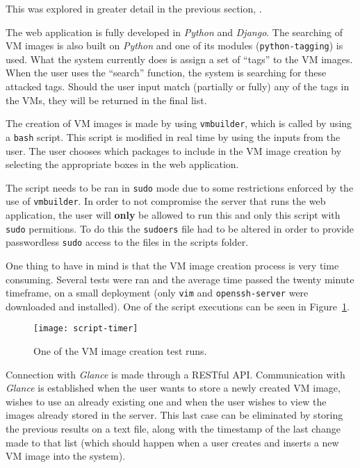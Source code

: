 This was explored in greater detail in the previous section, .


The web application is fully developed in \textit{Python} and \textit{Django}. The searching of VM images is also built on \textit{Python} and one of its modules (\texttt{python-tagging}) is used. What the system currently does is assign a set of ``tags'' to the VM images. When the user uses the ``search'' function, the system is searching for these attacked tags. Should the user input match (partially or fully) any of the tags in the VMs, they will be returned in the final list.

The creation of VM images is made by using \texttt{vmbuilder}, which is called by using a \texttt{bash} script. This script is modified in real time by using the inputs from the user. The user chooses which packages to include in the VM image creation by selecting the appropriate boxes in the web application.

The script needs to be ran in \texttt{sudo} mode due to some restrictions enforced by the use of \texttt{vmbuilder}. In order to not compromise the server that runs the web application, the user will \textbf{only} be allowed to run this and only this script with \texttt{sudo} permitions.
To do this the \texttt{sudoers} file had to be altered in order to provide passwordless \texttt{sudo} access to the files in the scripts folder. 

One thing to have in mind is that the VM image creation process is very time consuming. Several tests were ran and the average time passed the twenty minute timeframe, on a small deployment (only \texttt{vim} and \texttt{openssh-server} were downloaded and installed). One of the script executions can be seen in Figure~\ref{fig:script-timer}.

\begin{figure}[h]
  \begin{center}
    \leavevmode
    \texttt{[image: script-timer]}
    \caption{One of the VM image creation test runs.}
    \label{fig:script-timer}
  \end{center}
\end{figure}

Connection with \textit{Glance} is made through a RESTful API. Communication with \textit{Glance} is established when the user wants to store a newly created VM image, wishes to use an already existing one and when the user wishes to view the images already stored in the server. This last case can be eliminated by storing the previous results on a text file, along with the timestamp of the last change made to that list (which should happen when a user creates and inserts a new VM image into the system).

